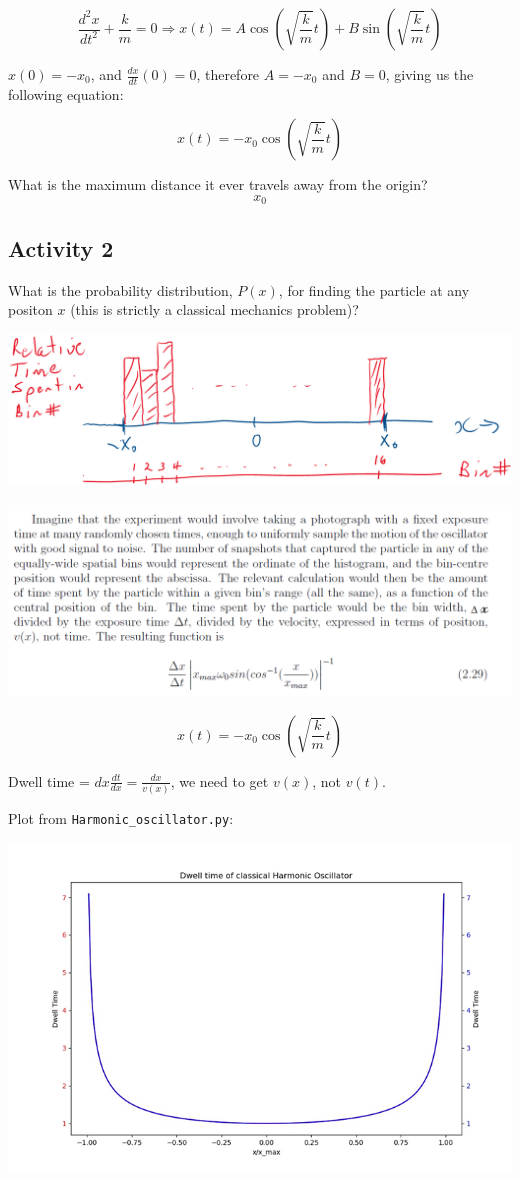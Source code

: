 \documentclass{article}
\begin{document}
$$\frac{d^2 x}{dt^2} + \frac{k}{m} = 0 \Rightarrow x(t) = A \cos \left( \sqrt{\frac{k}{m}} t \right) + B \sin \left( \sqrt{\frac{k}{m}} t \right)$$

$x(0) = -x_0$, and $\frac{dx}{dt}(0) = 0$, therefore $A = -x_0$ and $B = 0$, giving us the following equation:

$$x(t) = -x_0 \cos \left( \sqrt{\frac{k}{m}} t \right)$$

What is the maximum distance it ever travels away from the origin?
$$x_0$$

\subsection{Activity 2}

What is the probability distribution, $P(x)$, for finding the particle at any positon $x$ (this is strictly a classical mechanics problem)?


\includegraphics[width = 0.9 \textwidth]{Lecture07/1.png}

\includegraphics[width = 0.9 \textwidth]{Lecture07/2.png}

$$x(t) = -x_0 \cos \left( \sqrt{\frac{k}{m}} t \right)$$

Dwell time = $dx \frac{dt}{dx} = \frac{dx}{v(x)}$, we need to get $v(x)$, not $v(t)$. 

Plot from \verb|Harmonic_oscillator.py|:

\includegraphics[width = 0.7 \textwidth]{Lecture07/3.png}
\end{document}

